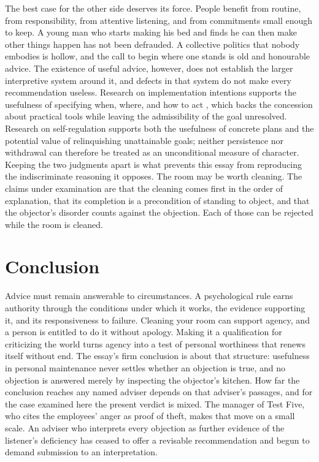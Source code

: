 \documentclass[12pt]{article}
\begin{document}
The best case for the other side deserves its force. People benefit from routine, from responsibility, from attentive listening, and from commitments small enough to keep. A young man who starts making his bed and finds he can then make other things happen has not been defrauded. A collective politics that nobody embodies is hollow, and the call to begin where one stands is old and honourable advice. The existence of useful advice, however, does not establish the larger interpretive system around it, and defects in that system do not make every recommendation useless. Research on implementation intentions supports the usefulness of specifying when, where, and how to act \cite{gollwitzer2006}, which backs the concession about practical tools while leaving the admissibility of the goal unresolved. Research on self-regulation supports both the usefulness of concrete plans and the potential value of relinquishing unattainable goals; neither persistence nor withdrawal can therefore be treated as an unconditional measure of character. Keeping the two judgments apart is what prevents this essay from reproducing the indiscriminate reasoning it opposes. The room may be worth cleaning. The claims under examination are that the cleaning comes first in the order of explanation, that its completion is a precondition of standing to object, and that the objector's disorder counts against the objection. Each of those can be rejected while the room is cleaned.

\section{Conclusion}\label{sec:concl}

Advice must remain answerable to circumstances. A psychological rule earns authority through the conditions under which it works, the evidence supporting it, and its responsiveness to failure. Cleaning your room can support agency, and a person is entitled to do it without apology. Making it a qualification for criticizing the world turns agency into a test of personal worthiness that renews itself without end. The essay's firm conclusion is about that structure: usefulness in personal maintenance never settles whether an objection is true, and no objection is answered merely by inspecting the objector's kitchen. How far the conclusion reaches any named adviser depends on that adviser's passages, and for the case examined here the present verdict is mixed. The manager of Test Five, who cites the employees' anger as proof of theft, makes that move on a small scale. An adviser who interprets every objection as further evidence of the listener's deficiency has ceased to offer a revisable recommendation and begun to demand submission to an interpretation.
\end{document}
